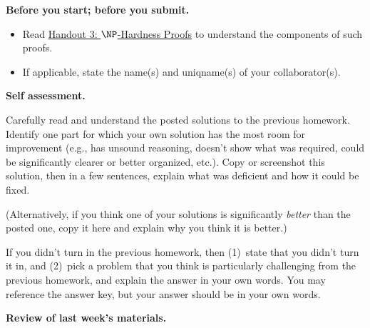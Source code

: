 \documentclass[11pt,addpoints]{exam}
\begin{document}
\hwpreface

\pointsinmargin
{}
\marginpointname{ \points}
\marginbonuspointname{ \bonuspoints}

\begin{questions}
  \addtocounter{question}{-1}

  \question[0] \textbf{Before you start; before you submit.}
  
  \begin{itemize}
  \item Read \href{https://drive.google.com/drive/u/1/folders/1fHV5RQgjvt0rWCTYv2EExI0M3cVDyi6G}{Handout 3: $\NP$-Hardness Proofs} to understand the components of such proofs.

  \item If applicable, state the name(s) and uniqname(s) of your collaborator(s).
    
    \begin{solution}
      
    \end{solution}
  \end{itemize}

  \question[10] \textbf{Self assessment.}
  
  Carefully read and understand the posted solutions to the previous homework.
  Identify one part for which your own solution has the most room for improvement (e.g., has unsound reasoning, doesn’t show what was required, could be significantly clearer or better organized, etc.).
  Copy or screenshot this solution, then in a few sentences, explain what was deficient and how it could be fixed.

  (Alternatively, if you think one of your solutions is significantly \emph{better} than the posted one, copy it here and explain why you think it is better.)

  If you didn't turn in the previous homework, then (1)~state that you didn't turn it in, and (2)~pick a problem that you think is particularly challenging from the previous homework, and explain the answer in your own words.
  You may reference the answer key, but your answer should be in your own words.

  \begin{solution}

  \end{solution}
  
  \question \textbf{Review of last week's materials.}
  
  \begin{parts}

\end{parts}
\end{questions}
\end{document}
